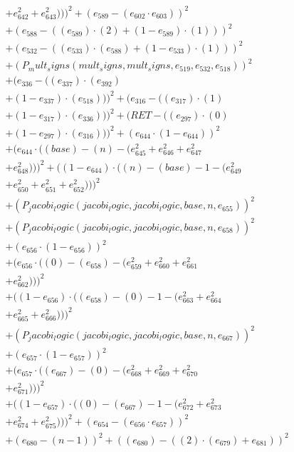 \documentclass[10pt, a4paper]{article}
\begin{document}
\begin{align*}
& + e_{642}^{2} + e_{643}^{2})))^{2} + (e_{589} - (e_{602}  \cdot  e_{603}))^{2} \\
& + (e_{588} - ((e_{589})  \cdot  (2) + (1 - e_{589})  \cdot  (1)))^{2} \\
& + (e_{532} - ((e_{533})  \cdot  (e_{588}) + (1 - e_{533})  \cdot  (1)))^{2} \\
& + (P_mult_signs(mult_signs, mult_signs, e_{519}, e_{532}, e_{518}))^{2} \\
& + (e_{336} - ((e_{337})  \cdot  (e_{392}) \\
& + (1 - e_{337})  \cdot  (e_{518})))^{2} + (e_{316} - ((e_{317})  \cdot  (1) \\
& + (1 - e_{317})  \cdot  (e_{336})))^{2} + (RET - ((e_{297})  \cdot  (0) \\
& + (1 - e_{297})  \cdot  (e_{316})))^{2} + (e_{644}  \cdot  (1 - e_{644}))^{2} \\
& + (e_{644}  \cdot  ((base) - (n) - (e_{645}^{2} + e_{646}^{2} + e_{647}^{2} \\
& + e_{648}^{2})))^{2} + ((1 - e_{644})  \cdot  ((n) - (base) - 1 - (e_{649}^{2} \\
& + e_{650}^{2} + e_{651}^{2} + e_{652}^{2})))^{2} \\
& + (P_jacobi_logic(jacobi_logic, jacobi_logic, base, n, e_{655}))^{2} \\
& + (P_jacobi_logic(jacobi_logic, jacobi_logic, base, n, e_{658}))^{2} \\
& + (e_{656}  \cdot  (1 - e_{656}))^{2} \\
& + (e_{656}  \cdot  ((0) - (e_{658}) - (e_{659}^{2} + e_{660}^{2} + e_{661}^{2} \\
& + e_{662}^{2})))^{2} \\
& + ((1 - e_{656})  \cdot  ((e_{658}) - (0) - 1 - (e_{663}^{2} + e_{664}^{2} \\
& + e_{665}^{2} + e_{666}^{2})))^{2} \\
& + (P_jacobi_logic(jacobi_logic, jacobi_logic, base, n, e_{667}))^{2} \\
& + (e_{657}  \cdot  (1 - e_{657}))^{2} \\
& + (e_{657}  \cdot  ((e_{667}) - (0) - (e_{668}^{2} + e_{669}^{2} + e_{670}^{2} \\
& + e_{671}^{2})))^{2} \\
& + ((1 - e_{657})  \cdot  ((0) - (e_{667}) - 1 - (e_{672}^{2} + e_{673}^{2} \\
& + e_{674}^{2} + e_{675}^{2})))^{2} + (e_{654} - (e_{656}  \cdot  e_{657}))^{2} \\
& + (e_{680} - (n - 1))^{2} + ((e_{680}) - ((2)  \cdot  (e_{679}) + e_{681}))^{2} \\

\end{align*}
\end{document}
